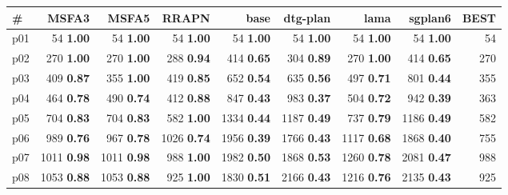 \begin{tabular}{|l|rrrrrrr|r|}
\hline
\textbf{\#} & \textbf{MSFA3} & \textbf{MSFA5} & \textbf{RRAPN} & \textbf{base} & \textbf{dtg-plan} & \textbf{lama} & \textbf{sgplan6} & \textbf{BEST}\\
\hline
p01 & {\footnotesize 54} \textbf{1.00} & {\footnotesize 54} \textbf{1.00} & {\footnotesize 54} \textbf{1.00} & {\footnotesize 54} \textbf{1.00} & {\footnotesize 54} \textbf{1.00} & {\footnotesize 54} \textbf{1.00} & {\footnotesize 54} \textbf{1.00} & 54\\
p02 & {\footnotesize 270} \textbf{1.00} & {\footnotesize 270} \textbf{1.00} & {\footnotesize 288} \textbf{0.94} & {\footnotesize 414} \textbf{0.65} & {\footnotesize 304} \textbf{0.89} & {\footnotesize 270} \textbf{1.00} & {\footnotesize 414} \textbf{0.65} & 270\\
p03 & {\footnotesize 409} \textbf{0.87} & {\footnotesize 355} \textbf{1.00} & {\footnotesize 419} \textbf{0.85} & {\footnotesize 652} \textbf{0.54} & {\footnotesize 635} \textbf{0.56} & {\footnotesize 497} \textbf{0.71} & {\footnotesize 801} \textbf{0.44} & 355\\
p04 & {\footnotesize 464} \textbf{0.78} & {\footnotesize 490} \textbf{0.74} & {\footnotesize 412} \textbf{0.88} & {\footnotesize 847} \textbf{0.43} & {\footnotesize 983} \textbf{0.37} & {\footnotesize 504} \textbf{0.72} & {\footnotesize 942} \textbf{0.39} & 363\\
p05 & {\footnotesize 704} \textbf{0.83} & {\footnotesize 704} \textbf{0.83} & {\footnotesize 582} \textbf{1.00} & {\footnotesize 1334} \textbf{0.44} & {\footnotesize 1187} \textbf{0.49} & {\footnotesize 737} \textbf{0.79} & {\footnotesize 1186} \textbf{0.49} & 582\\
p06 & {\footnotesize 989} \textbf{0.76} & {\footnotesize 967} \textbf{0.78} & {\footnotesize 1026} \textbf{0.74} & {\footnotesize 1956} \textbf{0.39} & {\footnotesize 1766} \textbf{0.43} & {\footnotesize 1117} \textbf{0.68} & {\footnotesize 1868} \textbf{0.40} & 755\\
p07 & {\footnotesize 1011} \textbf{0.98} & {\footnotesize 1011} \textbf{0.98} & {\footnotesize 988} \textbf{1.00} & {\footnotesize 1982} \textbf{0.50} & {\footnotesize 1868} \textbf{0.53} & {\footnotesize 1260} \textbf{0.78} & {\footnotesize 2081} \textbf{0.47} & 988\\
p08 & {\footnotesize 1053} \textbf{0.88} & {\footnotesize 1053} \textbf{0.88} & {\footnotesize 925} \textbf{1.00} & {\footnotesize 1830} \textbf{0.51} & {\footnotesize 2166} \textbf{0.43} & {\footnotesize 1216} \textbf{0.76} & {\footnotesize 2135} \textbf{0.43} & 925\\

\end{tabular}
